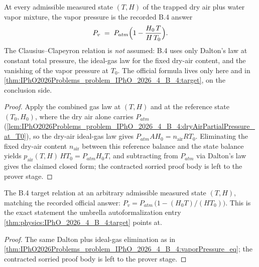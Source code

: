 \begin{theorem}
\label{thm:IPhO2026Problems_problem_IPhO_2026_4_B_4:vaporPressure_eq}
\leanok
{}
At every admissible measured state $(T, H)$ of the trapped dry air plus
water vapor mixture, the vapor pressure is the recorded B.4 answer
\[ P_v \;=\; P_{atm}\Bigl(1 - \frac{H_0\,T}{H\,T_0}\Bigr). \]
The Clausius--Clapeyron relation is \emph{not} assumed: B.4 uses only
Dalton's law at constant total pressure, the ideal-gas law for the fixed
dry-air content, and the vanishing of the vapor pressure at $T_0$.  The
official formula lives only here and in
\cref{thm:IPhO2026Problems_problem_IPhO_2026_4_B_4:target}, on the
conclusion side.
\end{theorem}
\begin{proof}
Apply the combined gas law at $(T, H)$ and at the reference state
$(T_0, H_0)$, where the dry air alone carries $P_{atm}$
(\cref{lem:IPhO2026Problems_problem_IPhO_2026_4_B_4:dryAirPartialPressure_at_T0}),
so the dry-air ideal-gas law gives
$P_{atm} A H_0 = n_{\mathrm{air}} R T_0$.  Eliminating the fixed dry-air
content $n_{\mathrm{air}}$ between this reference balance and the state
balance yields $p_{\mathrm{air}}(T,H)\,H T_0 = P_{atm} H_0 T$, and
subtracting from $P_{atm}$ via Dalton's law gives the claimed closed
form; the contracted sorried proof body is left to the prover stage.
\end{proof}

\begin{theorem}
\label{thm:IPhO2026Problems_problem_IPhO_2026_4_B_4:target}
\leanok
{}
The B.4 target relation at an arbitrary admissible measured state
$(T, H)$, matching the recorded official answer:
$P_v = P_{atm}\,\bigl(1 - (H_0 T)/(H T_0)\bigr)$.
This is the exact statement the umbrella autoformalization entry
\cref{thm:physics:IPhO_2026_4_B_4:target} points at.
\end{theorem}
\begin{proof}
The same Dalton plus ideal-gas elimination as in
\cref{thm:IPhO2026Problems_problem_IPhO_2026_4_B_4:vaporPressure_eq};
the contracted sorried proof body is left to the prover stage.
\end{proof}
